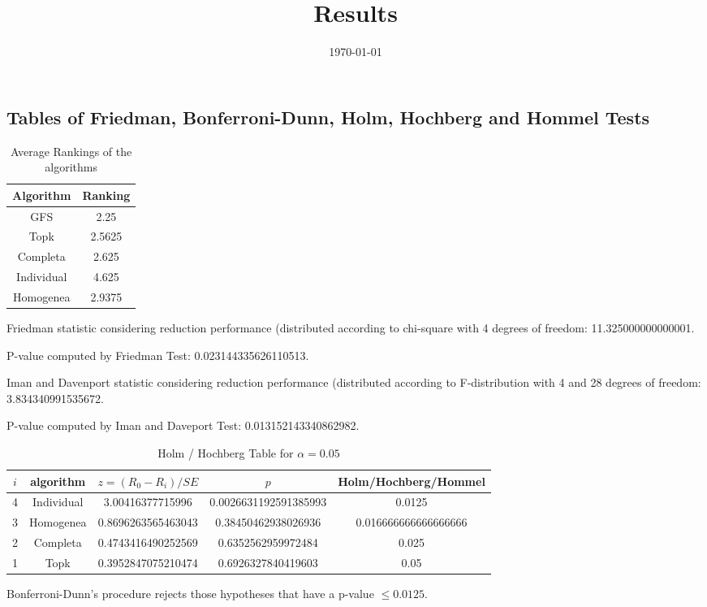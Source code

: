 \documentclass[a4paper,10pt]{article}
\title{Results}
\author{}
\date{\today}
\begin{document}
\begin{landscape}
\oddsidemargin 0in \topmargin 0in\maketitle
\section{Tables of Friedman, Bonferroni-Dunn, Holm, Hochberg and Hommel Tests}
\begin{table}[!htp]
\centering
\caption{Average Rankings of the algorithms
}\begin{tabular}{c|c}
Algorithm&Ranking\\
\hline
GFS&2.25\\
Topk&2.5625\\
Completa&2.625\\
Individual&4.625\\
Homogenea&2.9375\\
\end{tabular}
\end{table}


Friedman statistic considering reduction performance (distributed according to chi-square with 4 degrees of freedom: 11.325000000000001.


P-value computed by Friedman Test: 0.023144335626110513.\newline

Iman and Davenport statistic considering reduction performance (distributed according to F-distribution with 4 and 28 degrees of freedom: 3.834340991535672.


P-value computed by Iman and Daveport Test: 0.013152143340862982.\newline

\begin{table}[!htp]
\centering\tiny
\caption{Holm / Hochberg Table for $\alpha=0.05$}
\begin{tabular}{ccccc}
$i$&algorithm&$z=(R_0 - R_i)/SE$&$p$&Holm/Hochberg/Hommel\\
\hline
4&Individual&3.00416377715996&0.0026631192591385993&0.0125\\
3&Homogenea&0.8696263565463043&0.38450462938026936&0.016666666666666666\\
2&Completa&0.4743416490252569&0.6352562959972484&0.025\\
1&Topk&0.3952847075210474&0.6926327840419603&0.05\\
\hline
\end{tabular}
\end{table}
Bonferroni-Dunn's procedure rejects those hypotheses that have a p-value $\le0.0125$.



\end{landscape}
\end{document}
